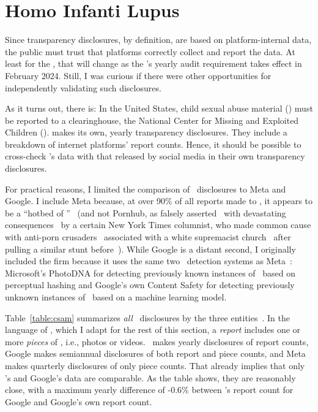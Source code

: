 
\newpage
\section{Homo Infanti Lupus}
\label{adx:csam}

Since transparency disclosures, by definition, are based on platform-internal
data, the public must trust that platforms correctly collect and report the
data. At least for the \EU, that will change as the \DSA's yearly audit
requirement takes effect in February 2024. Still, I was curious if there were
other opportunities for independently validating such disclosures.

As it turns out, there is: In the United States, child sexual abuse material
(\CSAM) must be reported to a clearinghouse, the National Center for Missing and
Exploited Children (\NCMEC). \NCMEC{} makes its own, yearly transparency
disclosures. They include a breakdown of internet platforms' report counts.
Hence, it should be possible to cross-check \NCMEC's data with that released by
social media in their own transparency disclosures.

For practical reasons, I limited the comparison of \CSAM\ disclosures to Meta
and Google. I include Meta because, at over 90\% of all reports made to \NCMEC,
it appears to be a ``hotbed of \CSAM''~\cite{Hitt2021} (and not Pornhub, as
falsely asserted~\cite{Brown2020,Grant2020} with devastating
consequences~\cite{Celarier2021,Dickson2020,Harris2021,Stoya2021,TheIndependent2021b}
by a certain New York Times columnist, who made common cause with anti-porn
crusaders~\cite{Hitt2020a} associated with a white supremacist
church~\cite{Halley2021,ProducerX2020} after pulling a similar stunt
before~\cite{Bass2014,Brown2019,Dickson2014,HuffPost2012,Martin2012,Masnick2017,Talusan2017}).
While Google is a distant second, I originally included the firm because it uses
the same two \CSAM\ detection systems as Meta~\cite{Allen2011,Davis2018}:
Microsoft's PhotoDNA for detecting previously known instances of \CSAM\ based on
perceptual hashing and Google's own Content Safety \API{} for detecting
previously unknown instances of \CSAM\ based on a machine learning model.

Table~\ref{table:csam} summarizes \emph{all} \CSAM\ disclosures by the three
entities~\cite{NcmecByPlatform2019,NcmecByPlatform2020,NcmecByPlatform2021}. In
the language of \NCMEC, which I adapt for the rest of this section, a
\emph{report} includes one or more \emph{pieces} of \CSAM, i.e., photos or
videos. \NCMEC\ makes yearly disclosures of report counts, Google makes
semiannual disclosures of both report and piece counts, and Meta makes quarterly
disclosures of only piece counts. That already implies that only \NCMEC's and
Google's data are comparable. As the table shows, they are reasonably close,
with a maximum yearly difference of -0.6\% between \NCMEC's report count for
Google and Google's own report count.

